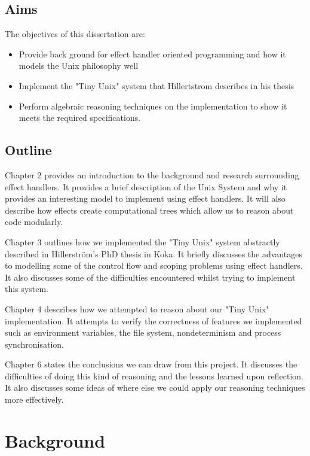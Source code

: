 \documentclass[logo,bsc,singlespacing,parskip]{infthesis}
\begin{document}
\section{Aims}
The objectives of this dissertation are:
\begin{itemize}
    \item Provide back ground for effect handler oriented programming and how it models the Unix philosophy well
    \item Implement the "Tiny Unix" system that Hillertstrom describes in his thesis
    \item Perform algebraic reasoning techniques on the implementation to show it meets the required specifications. 
    
\end{itemize}

\section{Outline}

Chapter 2 provides an introduction to the background and research surrounding effect handlers. It provides a brief description of the Unix System and why it provides an interesting model to implement using effect handlers. It will also describe how effects create computational trees which allow us to reason about code modularly.

Chapter 3 outlines how we implemented the "Tiny Unix" system abstractly described in Hillerström's PhD thesis in Koka. It briefly discusses the advantages to modelling some of the control flow and scoping problems using effect handlers. It also discusses some of the difficulties encountered whilst trying to implement this system.

Chapter 4 describes how we attempted to reason about our "Tiny Unix" implementation. It attempts to verify the correctness of features we implemented such as environment variables, the file system, nondeterminism and process synchronisation.   

Chapter 6 states the conclusions we can draw from this project. It discusses the difficulties of doing this kind of reasoning and the lessons learned upon reflection. It also discusses some ideas of where else we could apply our reasoning techniques more effectively.

\chapter{Background}
\end{document}
